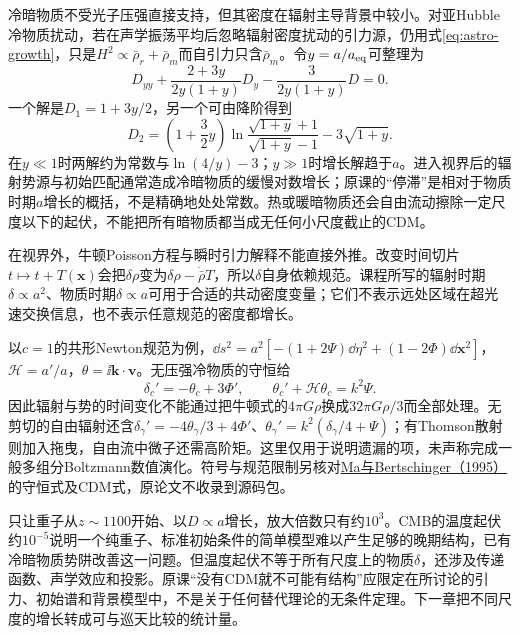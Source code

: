冷暗物质不受光子压强直接支持，但其密度在辐射主导背景中较小。对亚Hubble冷物质扰动，若在声学振荡平均后忽略辐射密度扰动的引力源，仍用式\eqref{eq:astro-growth}，只是$H^2\propto\bar\rho_r+\bar\rho_m$而自引力只含$\bar\rho_m$。令$y=a/a_{\rm eq}$可整理为
\begin{equation}\label{eq:astro-meszaros}
 D_{yy}+\frac{2+3y}{2y(1+y)}D_y-\frac{3}{2y(1+y)}D=0.
\end{equation}
一个解是$D_1=1+3y/2$，另一个可由降阶得到
\[
 D_2=\left(1+\frac32y\right)
 \ln\frac{\sqrt{1+y}+1}{\sqrt{1+y}-1}-3\sqrt{1+y}.
\]
在$y\ll1$时两解约为常数与$\ln(4/y)-3$；$y\gg1$时增长解趋于$a$。进入视界后的辐射势源与初始匹配通常造成冷暗物质的缓慢对数增长；原课的“停滞”是相对于物质时期$a$增长的概括，不是精确地处处常数。热或暖暗物质还会自由流动擦除一定尺度以下的起伏，不能把所有暗物质都当成无任何小尺度截止的CDM。

在视界外，牛顿Poisson方程与瞬时引力解释不能直接外推。改变时间切片$t\mapsto t+T(\mathbf x)$会把$\delta\rho$变为$\delta\rho-\dot{\bar\rho}T$，所以$\delta$自身依赖规范。课程所写的辐射时期$\delta\propto a^2$、物质时期$\delta\propto a$可用于合适的共动密度变量；它们不表示远处区域在超光速交换信息，也不表示任意规范的密度都增长。

以$c=1$的共形Newton规范为例，$\dd s^2=a^2[-(1+2\Psi)\dd\eta^2+(1-2\Phi)\dd\mathbf x^2]$，$\mathcal H=a'/a$，$\theta=\ii\mathbf k\cdot\mathbf v$。无压强冷物质的守恒给
\[
 \delta_c'=-\theta_c+3\Phi',\qquad
 \theta_c'+\mathcal H\theta_c=k^2\Psi.
\]
因此辐射与势的时间变化不能通过把牛顿式的$4\pi G\rho$换成$32\pi G\rho/3$而全部处理。无剪切的自由辐射还含$\delta_\gamma'=-4\theta_\gamma/3+4\Phi'$、$\theta_\gamma'=k^2(\delta_\gamma/4+\Psi)$；有Thomson散射则加入拖曳，自由流中微子还需高阶矩。这里仅用于说明遗漏的项，未声称完成一般多组分Boltzmann数值演化。符号与规范限制另核对\href{https://arxiv.org/abs/astro-ph/9506072}{Ma与Bertschinger（1995）}的守恒式及CDM式，原论文不收录到源码包。

只让重子从$z\sim1100$开始、以$D\propto a$增长，放大倍数只有约$10^3$。CMB的温度起伏约$10^{-5}$说明一个纯重子、标准初始条件的简单模型难以产生足够的晚期结构，已有冷暗物质势阱改善这一问题。但温度起伏不等于所有尺度上的物质$\delta$，还涉及传递函数、声学效应和投影。原课“没有CDM就不可能有结构”应限定在所讨论的引力、初始谱和背景模型中，不是关于任何替代理论的无条件定理。下一章把不同尺度的增长转成可与巡天比较的统计量。
